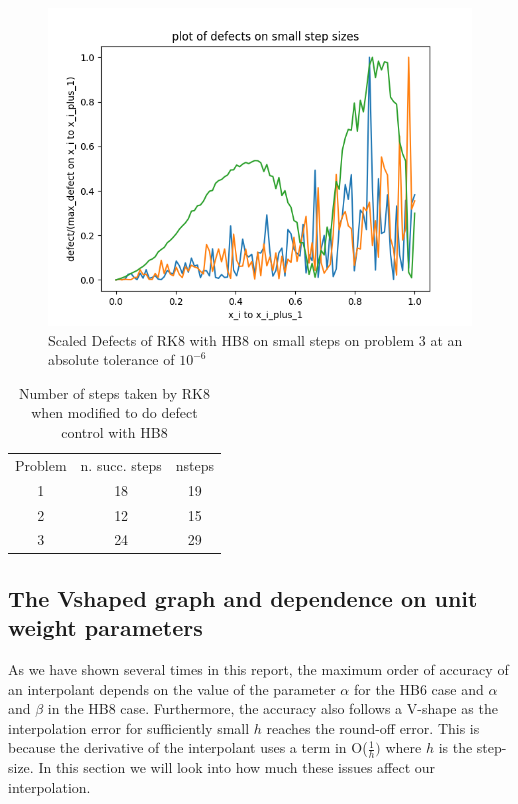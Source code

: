 \documentclass{article}
\begin{document}
\begin{figure}[H]
\centering
\includegraphics[width=0.7\linewidth]{./figures/rk8_with_hb8_p3_scaled_defects_small_steps}
\caption{Scaled Defects of RK8 with HB8 on small steps on problem 3 at an absolute tolerance of $10^{-6}$}
\label{fig:rk8_with_hb8_p3_scaled_defects_small_steps}
\end{figure}

\begin{table}[h]
\caption {Number of steps taken by RK8 when modified to do defect control with HB8} \label{tab:rk8_with_hb8_nsteps}
\begin{center}
\begin{tabular}{ c c c } 
Problem & n. succ. steps & nsteps \\ 
1       & 18             &        19 \\ 
2       & 12             &        15 \\
3       & 24             &        29 \\
\end{tabular}
\end{center}
\end{table}


\subsection{The Vshaped graph and dependence on unit weight parameters}
\label{section:v_shaped_graph}
As we have shown several times in this report, the maximum order of accuracy of an interpolant depends on the value of the parameter $\alpha$ for the HB6 case and $\alpha$ and $\beta$ in the HB8 case. Furthermore, the accuracy also follows a V-shape as the interpolation error for sufficiently small $h$ reaches the round-off error. This is because the derivative of the interpolant uses a term in O($\frac{1}{h})$ where $h$ is the step-size. In this section we will look into how much these issues affect our interpolation. 
\end{document}
